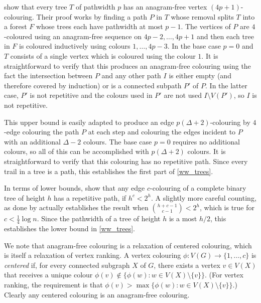 \documentclass[kpfonts]{patmorin}
\begin{document}
\citet{wilson.wood:anagram-free} show that every tree $T$ of pathwidth $p$ has an anagram-free vertex $(4p+1)$-colouring.  Their proof works by finding a path $P$ in $T$ whose removal splits $T$ into a forest $F$ whose trees each have pathwidth at most $p-1$.  The vertices of $P$ are $4$-coloured using an anagram-free sequence on $4p-2,\ldots,4p+1$ and then each tree in $F$ is coloured inductively using colours $1,\ldots,4p-3$.  In the base case $p=0$ and $T$ consists of a single vertex which is coloured using the colour $1$.  It is straightforward to verify that this produces an anagram-free colouring using the fact the intersection between $P$ and any other path $I$ is either empty (and therefore covered by induction) or is a connected subpath $P'$ of $P$. In the latter case, $P'$ is not repetitive and the colours used in $P'$ are not used $I\setminus V(P')$, so $I$ is not repetitive.

This upper bound is easily adapted to produce an edge $p(\Delta+2)$-colouring by $4$-edge colouring the path $P$ at each step and colouring the edges incident to $P$ with an additional $\Delta-2$ colours. The base case $p=0$ requires no additional colours, so all of this can be accomplished with $p(\Delta+2)$ colours.  It is straightforward to verify that this colouring has no repetitive path.  Since every trail in a tree is a path, this establishes the first part of \cref{ww_trees}.

In terms of lower bounds, \citet[Theorem~13]{wilson.wood:anagram-free} show that any edge $c$-colouring of a complete binary tree of height $h$ has a repetitive path, if $h^c < 2^h$.  A slightly more careful counting, as done by \citet[Proposition~2.1]{kamcev.luczak.ea:anagram-free} actually establishes the result when $\binom{h+c-1}{c-1} < 2^h$, which is true for $c < \tfrac{1}{4}\log n$.  Since the pathwidth of a tree of height $h$ is a most $h/2$, this establishes the lower bound in \cref{ww_trees}.


We note that anagram-free colouring is a relaxation of centered colouring, which is itself a relaxation of vertex ranking.  A vertex colouring $\phi:V(G)\to\{1,\ldots,c\}$ is \emph{centered} if, for every connected subgraph $X$ of $G$, there exists a vertex $v\in V(X)$ that receives a unique colour $\phi(v)\not\in\{\phi(w):w\in V(X)\setminus\{v\}\}$. (For vertex ranking, the requirement is that $\phi(v)>\max\{\phi(w):w\in V(X)\setminus\{v\}\}$.)  Clearly any centered colouring is an anagram-free colouring.
\end{document}

